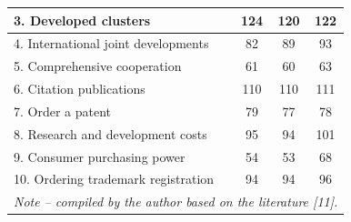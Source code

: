 \begin{table}[H]
\begin{tabular}{|lccc|}
\multicolumn{1}{|l|}{3. Developed clusters}                & \multicolumn{1}{c|}{124} & \multicolumn{1}{c|}{120} & 122 \\ \hline
\multicolumn{1}{|l|}{4. International joint developments}  & \multicolumn{1}{c|}{82}  & \multicolumn{1}{c|}{89}  & 93  \\ \hline
\multicolumn{1}{|l|}{5. Comprehensive cooperation}         & \multicolumn{1}{c|}{61}  & \multicolumn{1}{c|}{60}  & 63  \\ \hline
\multicolumn{1}{|l|}{6. Citation publications}             & \multicolumn{1}{c|}{110} & \multicolumn{1}{c|}{110} & 111 \\ \hline
\multicolumn{1}{|l|}{7. Order a patent}                    & \multicolumn{1}{c|}{79}  & \multicolumn{1}{c|}{77}  & 78  \\ \hline
\multicolumn{1}{|l|}{8. Research and development costs}    & \multicolumn{1}{c|}{95}  & \multicolumn{1}{c|}{94}  & 101 \\ \hline
\multicolumn{1}{|l|}{9. Consumer purchasing power}         & \multicolumn{1}{c|}{54}  & \multicolumn{1}{c|}{53}  & 68  \\ \hline
\multicolumn{1}{|l|}{10. Ordering trademark registration}  & \multicolumn{1}{c|}{94}  & \multicolumn{1}{c|}{94}  & 96  \\ \hline
\multicolumn{4}{|l|}{\textit{Note – compiled by the author based on the literature {[}11{]}.}}                          \\ \hline
\end{tabular}
\end{table}

